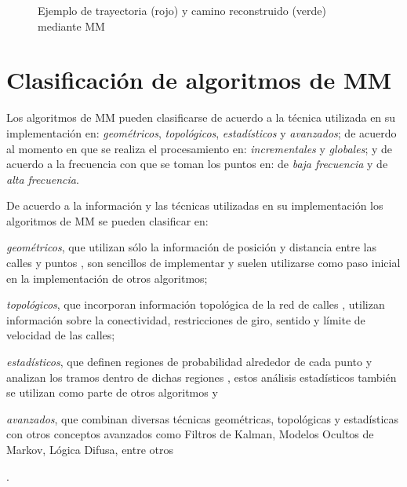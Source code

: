 \begin{figure}[h]
	\centering
	
	\caption[Trayectoria y camino reconstruido mediante MM]{Ejemplo de trayectoria (rojo) y camino reconstruido (verde) mediante MM}
	\label{fig:map-matching} 
\end{figure}

\section{Clasificación de algoritmos de MM}

Los algoritmos de MM pueden clasificarse de acuerdo a la técnica utilizada en su implementación en: \emph{geométricos}, \emph{topológicos}, \emph{estadísticos} y \emph{avanzados}; de acuerdo al momento en que se realiza el procesamiento en: \emph{incrementales} y \emph{globales}; y de acuerdo a la frecuencia con que se toman los puntos en: de \emph{baja frecuencia} y de \emph{alta frecuencia}.

De acuerdo a la información y las técnicas utilizadas en su implementación los algoritmos de MM se pueden clasificar en: \begin{enumerate*}[1)]\item \emph{geométricos}, que utilizan sólo la información de posición y distancia entre las calles y puntos \cite{white2000some}, son sencillos de implementar y suelen utilizarse como paso inicial en la implementación de otros algoritmos; \item \emph{topológicos}, que incorporan información topológica de la red de calles \cite{lou2009map,yuan2010interactive,greenfeld2002matching,quddus2003general}, utilizan información sobre la conectividad, restricciones de giro, sentido y límite de velocidad de las calles; \item \emph{estadísticos}, que definen regiones de probabilidad alrededor de cada punto y analizan los tramos dentro de dichas regiones \cite{ochieng2009map}, estos análisis estadísticos también se utilizan como parte de otros algoritmos y \item \emph{avanzados}, que combinan diversas técnicas geométricas, topológicas y estadísticas con otros conceptos avanzados como Filtros de Kalman, Modelos Ocultos de Markov, Lógica Difusa, entre otros \cite{thiagarajan2009vtrack,quddus2006high,thiagarajan2011accurate,fang2011enacq}\end{enumerate*}.

